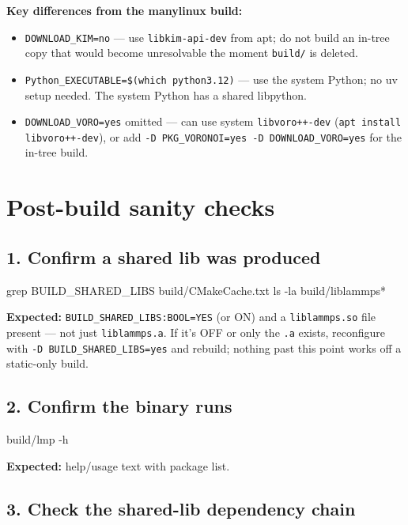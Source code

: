 \documentclass[11pt]{article}
\begin{document}
\textbf{Key differences from the manylinux build:}
\begin{itemize}
  \item \texttt{DOWNLOAD\_KIM=no} --- use \texttt{libkim-api-dev} from apt;
    do not build an in-tree copy that would become unresolvable the moment
    \texttt{build/} is deleted.
  \item \texttt{Python\_EXECUTABLE=\$(which python3.12)} --- use the system
    Python; no uv setup needed.  The system Python has a shared libpython.
  \item \texttt{DOWNLOAD\_VORO=yes} omitted --- can use system
    \texttt{libvoro++-dev} (\texttt{apt install libvoro++-dev}), or add
    \texttt{-D PKG\_VORONOI=yes -D DOWNLOAD\_VORO=yes} for the in-tree build.
\end{itemize}

\section{Post-build sanity checks}

\subsection*{1. Confirm a shared lib was produced}

\begin{codebox}
grep BUILD_SHARED_LIBS build/CMakeCache.txt
ls -la build/liblammps*
\end{codebox}

\textbf{Expected:} \texttt{BUILD\_SHARED\_LIBS:BOOL=YES} (or ON) and a
\texttt{liblammps.so} file present --- not just \texttt{liblammps.a}.  If it's
OFF or only the \texttt{.a} exists, reconfigure with
\texttt{-D BUILD\_SHARED\_LIBS=yes} and rebuild; nothing past this point works
off a static-only build.

\subsection*{2. Confirm the binary runs}

\begin{codebox}
build/lmp -h
\end{codebox}

\textbf{Expected:} help/usage text with package list.

\subsection*{3. Check the shared-lib dependency chain}
\end{document}
